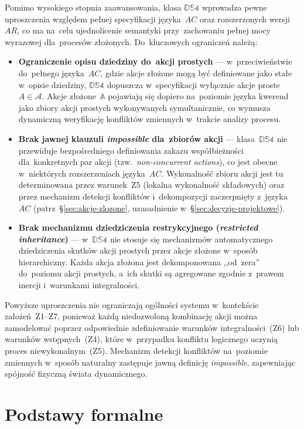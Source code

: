 \documentclass[11pt,a4paper]{article}
\theoremstyle{definition}
\begin{document}
Pomimo wysokiego stopnia zaawansowania, klasa $\mathbb{DS4}$ wprowadza pewne uproszczenia względem pełnej specyfikacji języka~$AC$ oraz rozszerzonych wersji~$AR$, co ma na~celu ujednolicenie semantyki przy~zachowaniu pełnej mocy wyrazowej dla~procesów złożonych. Do~kluczowych ograniczeń należą:
\begin{itemize}
  \item \textbf{Ograniczenie opisu dziedziny do~akcji prostych} --- w~przeciwieństwie do~pełnego języka~$AC$, gdzie akcje złożone mogą być definiowane jako stałe w~opisie dziedziny, $\mathbb{DS4}$ dopuszcza w~specyfikacji wyłącznie akcje proste $A \in \mathcal{A}$. Akcje złożone~$\mathbb{A}$ pojawiają się dopiero na~poziomie języka kwerend jako zbiory akcji prostych wykonywanych symultanicznie, co wymusza dynamiczną weryfikację konfliktów zmiennych w~trakcie analizy procesu.
  \item \textbf{Brak jawnej klauzuli \textit{impossible} dla~zbiorów akcji} --- klasa~$\mathbb{DS4}$ nie przewiduje bezpośredniego definiowania zakazu współbieżności dla~konkretnych par akcji (tzw.\ \textit{non-concurrent actions}), co jest obecne w~niektórych rozszerzeniach języka~$AC$. Wykonalność zbioru akcji jest tu determinowana przez warunek~Z5 (lokalna wykonalność składowych) oraz przez mechanizm detekcji konfliktów i~dekompozycji zaczerpnięty z~języka~$AC$ (patrz~§\ref{sec:akcje-zlozone}, uzasadnienie w~§\ref{sec:decyzje-projektowe}).
  \item \textbf{Brak mechanizmu dziedziczenia restrykcyjnego (\textit{restricted inheritance})} --- w~$\mathbb{DS4}$ nie stosuje się mechanizmów automatycznego dziedziczenia skutków akcji prostych przez akcje złożone w~sposób hierarchiczny. Każda akcja złożona jest dekomponowana ,,od~zera'' do~poziomu akcji prostych, a~ich skutki są agregowane zgodnie z~prawem inercji i~warunkami integralności.
\end{itemize}
Powyższe uproszczenia nie ograniczają ogólności systemu w~kontekście założeń~Z1--Z7, ponieważ każdą niedozwoloną kombinację akcji można zamodelować poprzez odpowiednie zdefiniowanie warunków integralności~(Z6) lub warunków wstępnych~(Z4), które w~przypadku konfliktu logicznego uczynią proces niewykonalnym~(Z5). Mechanizm detekcji konfliktów na~poziomie zmiennych w~sposób naturalny zastępuje jawną definicję \textit{impossible}, zapewniając spójność fizyczną świata dynamicznego.

\section{Podstawy formalne}
\end{document}
